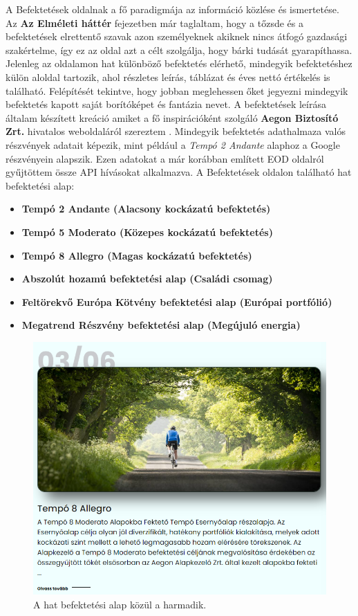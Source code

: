 A Befektetések oldalnak a fő paradigmája az információ közlése és ismertetése. Az \textbf{Az Elméleti háttér} fejezetben már taglaltam, hogy a tőzsde és a befektetések elrettentő szavak azon személyeknek akiknek nincs átfogó gazdasági szakértelme, így ez az oldal azt a célt szolgálja, hogy bárki tudását gyarapíthassa. Jelenleg az oldalamon hat különböző befektetés elérhető, mindegyik befektetéshez külön aloldal tartozik, ahol részletes leírás, táblázat és éves nettó értékelés is található. Felépítését tekintve, hogy jobban meglehessen őket jegyezni mindegyik befektetés kapott saját borítóképet és fantázia nevet. A befektetések leírása általam készített kreáció amiket a fő inspirációként szolgáló \textbf{Aegon Biztosító Zrt.} hivatalos weboldaláról szereztem \cite{Aegon}. Mindegyik befektetés adathalmaza valós részvények adatait képezik, mint például a \emph{Tempó 2 Andante} alaphoz a Google részvényein alapszik. Ezen adatokat a már korábban említett EOD oldalról gyűjtöttem össze API hívásokat alkalmazva. \cite{eod} 
A Befektetések oldalon található hat befektetési alap:
\begin{itemize}
\item \textbf{Tempó 2 Andante (Alacsony kockázatú befektetés)}
\item \textbf{Tempó 5 Moderato (Közepes kockázatú befektetés)}
\item \textbf{Tempó 8 Allegro (Magas kockázatú befektetés)}
\item \textbf{Abszolút hozamú befektetési alap (Családi csomag)}
\item \textbf{Feltörekvő Európa Kötvény befektetési alap (Európai portfólió)}
\item \textbf{Megatrend Részvény befektetési alap (Megújuló energia)} \cite{Aegon}
\end{itemize}

\begin{figure}[h]
\centering
\includegraphics[scale=0.5]{images/invest.png}
\caption{A hat befektetési alap közül a harmadik.}
\end{figure}

